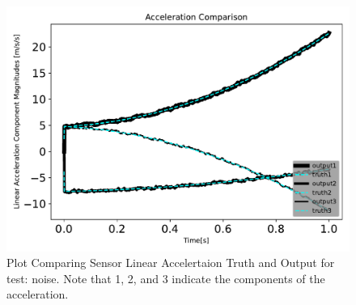 \begin{figure}[htbp]\centerline{\includegraphics[height=0.7\textwidth, keepaspectratio]{AutoTeX/noiseaccelComparison}}\caption{Plot Comparing Sensor Linear Accelertaion Truth and Output for test: noise. Note that 1, 2, and 3 indicate the components of the acceleration.}\label{fig:noiseaccelComparison}\end{figure}